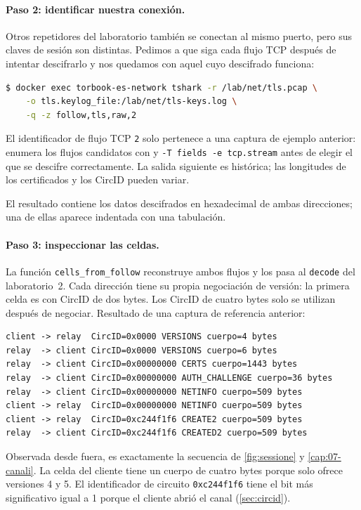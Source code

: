 \paragraph{Paso 2: identificar nuestra conexión.} Otros repetidores del laboratorio también se conectan al mismo puerto, pero sus claves de sesión son distintas. Pedimos a  que siga cada flujo TCP después de intentar descifrarlo y nos quedamos con aquel cuyo descifrado funciona:
\begin{lstlisting}[language=bash,numbers=none]
$ docker exec torbook-es-network tshark -r /lab/net/tls.pcap \
    -o tls.keylog_file:/lab/net/tls-keys.log \
    -q -z follow,tls,raw,2
\end{lstlisting}
El identificador de flujo TCP \texttt{2} solo pertenece a una captura de ejemplo anterior: enumera los flujos candidatos con  y \texttt{-T fields -e tcp.stream} antes de elegir el que se descifre correctamente. La salida siguiente es histórica; las longitudes de los certificados y los CircID pueden variar.

El resultado contiene los datos descifrados en hexadecimal de ambas direcciones; una de ellas aparece indentada con una tabulación.

\paragraph{Paso 3: inspeccionar las celdas.} La función \texttt{cells\_from\_follow} reconstruye ambos flujos y los pasa al \texttt{decode} del laboratorio~2. Cada dirección tiene su propia negociación de versión: la primera celda es  con CircID de dos bytes. Los CircID de cuatro bytes solo se utilizan después de negociar. Resultado de una captura de referencia anterior:
\begin{lstlisting}[numbers=none]
client -> relay  CircID=0x0000 VERSIONS cuerpo=4 bytes
relay  -> client CircID=0x0000 VERSIONS cuerpo=6 bytes
relay  -> client CircID=0x00000000 CERTS cuerpo=1443 bytes
relay  -> client CircID=0x00000000 AUTH_CHALLENGE cuerpo=36 bytes
relay  -> client CircID=0x00000000 NETINFO cuerpo=509 bytes
client -> relay  CircID=0x00000000 NETINFO cuerpo=509 bytes
client -> relay  CircID=0xc244f1f6 CREATE2 cuerpo=509 bytes
relay  -> client CircID=0xc244f1f6 CREATED2 cuerpo=509 bytes
\end{lstlisting}

Observada desde fuera, es exactamente la secuencia de \cref{fig:sessione} y \cref{cap:07-canali}. La celda  del cliente tiene un cuerpo de cuatro bytes porque  solo ofrece versiones 4 y 5. El identificador de circuito \texttt{0xc244f1f6} tiene el bit más significativo igual a 1 porque el cliente abrió el canal (\cref{sec:circid}).

